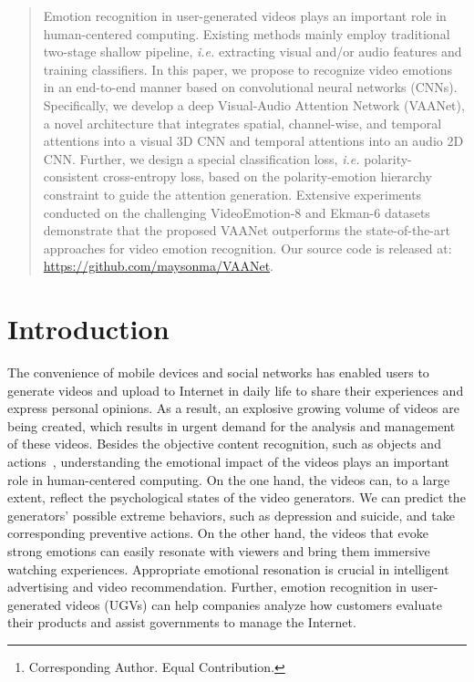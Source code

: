\documentclass[letterpaper]{article} \usepackage{aaai20}  \usepackage{times}  \usepackage{helvet} \usepackage{courier}  \usepackage[hyphens]{url}  \usepackage{graphicx} \urlstyle{rm} \def\UrlFont{\rm}  \usepackage{graphicx}
\author{
Sicheng Zhao, Yunsheng Ma, Yang Gu, Jufeng Yang\thanks{Corresponding Author.  Equal Contribution.}, \\
\Large \textbf{Tengfei Xing, Pengfei Xu, Runbo Hu, Hua Chai, Kurt Keutzer}\\
University of California, Berkeley, USA  Didi Chuxing, China\\
  Harbin Institute of Technology, Weihai, China  Nankai University, China\\
  schzhao@gmail.com, 
  yunsheng.ma98@gmail.com, yangjufeng@nankai.edu.cn\\
  \{guyangdavid,xingtengfei,xupengfeipf,hurunbo,chaihua\}@didiglobal.com, keutzer@berkeley.edu \\
}
\begin{document}
\maketitle

\begin{abstract}
Emotion recognition in user-generated videos plays an important role in human-centered computing. Existing methods mainly employ traditional two-stage shallow pipeline, \textit{i.e.} extracting visual and/or audio features and training classifiers. In this paper, we propose to recognize video emotions in an end-to-end manner based on convolutional neural networks (CNNs). Specifically, we develop a deep Visual-Audio Attention Network (VAANet), a novel architecture that integrates spatial, channel-wise, and temporal attentions into a visual 3D CNN and temporal attentions into an audio 2D CNN. Further, we design a special classification loss, \textit{i.e.} polarity-consistent cross-entropy loss, based on the polarity-emotion hierarchy constraint to guide the attention generation. Extensive experiments conducted on the challenging VideoEmotion-8 and Ekman-6 datasets demonstrate that the proposed VAANet outperforms the state-of-the-art approaches for video emotion recognition. Our source code is released at: \url{https://github.com/maysonma/VAANet}.
\end{abstract}



\section{Introduction}
\label{sec:Introduction}


The convenience of mobile devices and social networks has enabled users to generate videos and upload to Internet in daily life to share their experiences and express personal opinions. As a result, an explosive growing volume of videos are being created, which results in urgent demand for the analysis and management of these videos. Besides the objective content recognition, such as objects and actions~\cite{zhu2018towards,choutas2018potion}, understanding the emotional impact of the videos plays an important role in human-centered computing. On the one hand, the videos can, to a large extent, reflect the psychological states of the video generators. We can predict the generators' possible extreme behaviors, such as depression and suicide, and take corresponding preventive actions. On the other hand, the videos that evoke strong emotions can easily resonate with viewers and bring them immersive watching experiences. Appropriate emotional resonation is crucial in intelligent advertising and video recommendation. Further, emotion recognition in user-generated videos (UGVs) can help companies analyze how customers evaluate their products and assist governments to manage the Internet.
\end{document}
